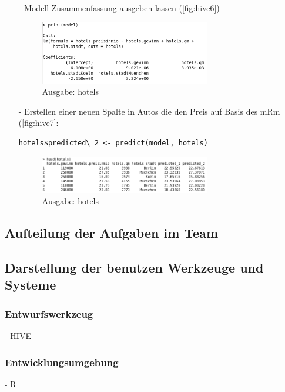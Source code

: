 \begin{itemize}
\item[-] Modell Zusammenfassung ausgeben lassen (\autoref{fig:hive6})
\begin{figure}[!htb]
        \begin{minipage}{1\textwidth}
                \centering
                \includegraphics[width=0.70\textwidth]{pics/Hotels_model_2.png}\par\vspace{0cm}
                \caption{Ausgabe: hotels}
                \label{fig:hive6}
        \end{minipage}
\end{figure}
\item[-] Erstellen einer neuen Spalte in Autos die den Preis auf Basis des mRm (\autoref{fig:hive7}: 
\begin{lstlisting}
hotels$predicted\_2 <- predict(model, hotels)
\end{lstlisting}
\begin{figure}[!htb]
        \begin{minipage}{1\textwidth}
                \centering
                \includegraphics[width=0.70\textwidth]{pics/hotels_head.png}\par\vspace{0cm}
                \caption{Ausgabe: hotels}
                \label{fig:hive7}
        \end{minipage}
\end{figure}
\end{itemize}

\subsection*{Aufteilung der Aufgaben im Team}
\subsection*{Darstellung der benutzen Werkzeuge und Systeme}
\subsubsection*{Entwurfswerkzeug}
- HIVE 

\subsubsection*{Entwicklungsumgebung}
- R

